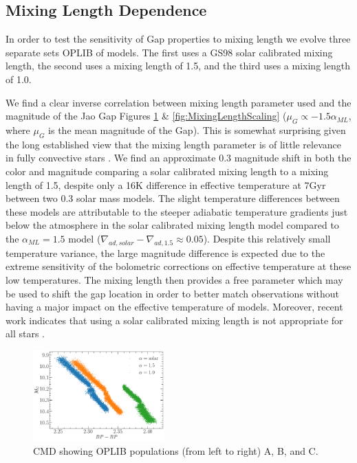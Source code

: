 \subsection{Mixing Length Dependence}
In order to test the sensitivity of Gap properties to mixing length we
evolve three separate sets OPLIB of models. The first uses a GS98
solar calibrated mixing length, the second uses a mixing length of
1.5, and the third uses a mixing length of 1.0.

We find a clear inverse correlation between mixing length parameter used and
the magnitude of the Jao Gap Figures \ref{fig:MixingLengthCMD} \&
\ref{fig:MixingLengthScaling} ($\mu_{G} \propto -1.5\alpha_{ML}$, where
$\mu_{G}$ is the mean magnitude of the Gap). This is somewhat surprising given
the long established view that the mixing length parameter is of little
relevance in fully convective stars \citep{Baraffe1997}. We find an approximate
0.3 magnitude shift in both the color and magnitude comparing a solar
calibrated mixing length to a mixing length of 1.5, despite only a 16K
difference in effective temperature at 7Gyr between two 0.3 solar mass models.
The slight temperature differences between these models are
attributable to the steeper adiabatic temperature gradients just below the
atmosphere in the solar calibrated mixing length model compared to the
$\alpha_{ML} = 1.5$ model ($\nabla_{ad,solar} - \nabla_{ad,1.5} \approx 0.05$).
Despite this relatively small temperature variance, the large magnitude
difference is expected due to the extreme sensitivity of the bolometric
corrections on effective temperature at these low temperatures. The
mixing length then provides a free parameter which may be used to shift the gap
location in order to better match observations without having a major impact on
the effective temperature of models. Moreover, recent work indicates that using
a solar calibrated mixing length is not appropriate for all stars
\citep[e.g.][]{Trampedach2014, Joyce2018}.

\begin{figure}
	\centering
	\includegraphics[width=0.45\textwidth]{figures/jaoOpacity/./alphaMLComparisionCMD.pdf}
	\caption{CMD showing OPLIB populations (from left to right) A, B, and C.}
	\label{fig:MixingLengthCMD}
\end{figure}

